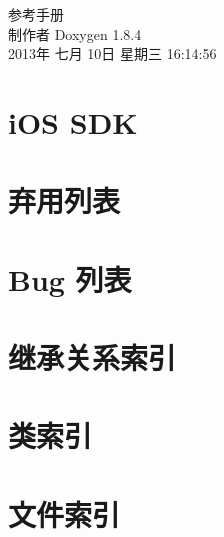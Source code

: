 \documentclass[twoside]{book}
\newcommand{\clearemptydoublepage}{%
  \newpage{\pagestyle{empty}\cleardoublepage}%
}
\begin{document}
\hypersetup{pageanchor=false}
\begin{titlepage}
\vspace*{7cm}
\begin{center}%
{\Large 参考手册}\\
\vspace*{1cm}
{\large 制作者 Doxygen 1.8.4}\\
\vspace*{0.5cm}
{\small 2013年 七月 10日 星期三 16:14:56}\\
\end{center}
\end{titlepage}
\clearemptydoublepage
\tableofcontents
\clearemptydoublepage
{}
\hypersetup{pageanchor=true}

\chapter{i\-O\-S S\-D\-K}
\label{index}\hypertarget{index}{}
\chapter{弃用列表}
\label{deprecated}
\hypertarget{deprecated}{}

\chapter{Bug 列表}
\label{bug}
\hypertarget{bug}{}

\chapter{继承关系索引}

\chapter{类索引}

\chapter{文件索引}

\end{document}

